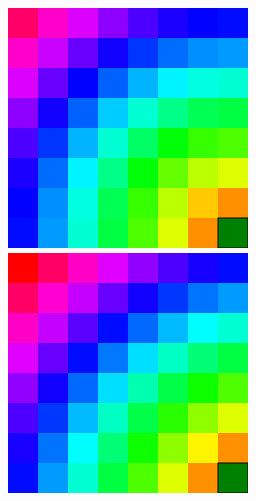 \begin{figure}
\centering
\begin{minipage}{.44\textwidth}
\centering
  \includegraphics[width=0.9\linewidth]{abbildungen/vergleich_euklid_fast_marching/eEuclid_2m.png}
\end{minipage}%
\begin{minipage}{.44\textwidth}
\centering
  \includegraphics[width=0.9\linewidth]{abbildungen/vergleich_euklid_fast_marching/eFastMarching_2m.png}

\end{minipage}
\end{figure}
